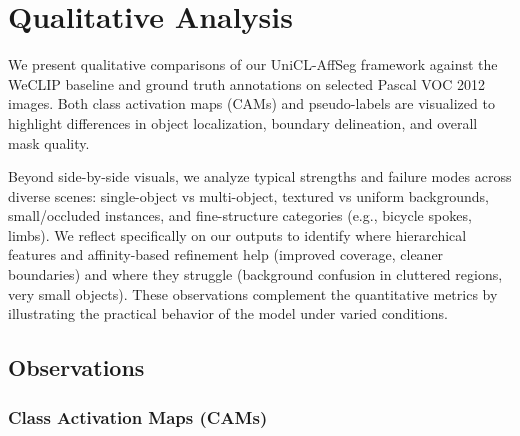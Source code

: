 \section{Qualitative Analysis}
\label{sec:qualitative_analysis}

We present qualitative comparisons of our UniCL-AffSeg framework against the WeCLIP baseline and ground truth annotations on selected Pascal VOC 2012 images. Both class activation maps (CAMs) and pseudo-labels are visualized to highlight differences in object localization, boundary delineation, and overall mask quality.

Beyond side-by-side visuals, we analyze typical strengths and failure modes across diverse scenes: single-object vs multi-object, textured vs uniform backgrounds, small/occluded instances, and fine-structure categories (e.g., bicycle spokes, limbs). We reflect specifically on our outputs to identify where hierarchical features and affinity-based refinement help (improved coverage, cleaner boundaries) and where they struggle (background confusion in cluttered regions, very small objects). These observations complement the quantitative metrics by illustrating the practical behavior of the model under varied conditions.


\subsection{Observations}

\subsubsection{Class Activation Maps (CAMs)}




